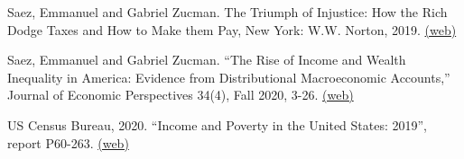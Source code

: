 \documentclass[landscape]{slides}
\begin{document}
\begin{slide}
{Saez, Emmanuel and Gabriel Zucman. The Triumph of Injustice: How the Rich Dodge Taxes and How to Make them Pay, New York: W.W. Norton, 2019. 
\href{http://www.taxjusticenow.org} {(web)}

Saez, Emmanuel and Gabriel Zucman. ``The Rise of Income and Wealth Inequality in America: Evidence from Distributional Macroeconomic Accounts,'' Journal of Economic Perspectives 34(4), Fall 2020, 3-26.
\href{https://eml.berkeley.edu/~saez/SaezZucman2020JEP.pdf}{(web)} 


US Census Bureau, 2020. ``Income and Poverty in the United States: 2019'', report P60-263.
\href{http://elsa.berkeley.edu/~saez/course131/CPSpoverty.pdf}{(web)} 

}


\end{slide}
\end{document}
